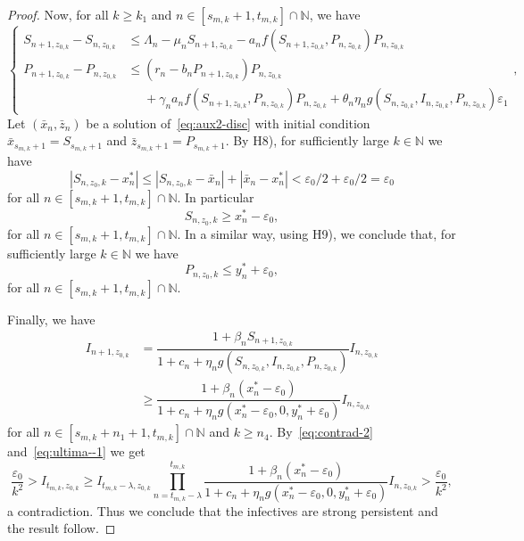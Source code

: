 \documentclass[reqno]{amsart}
\renewcommand{\le}{\leqslant}
\renewcommand{\ge}{\geqslant}
\newcommand{\eps}{\varepsilon}
\newcommand{\N}{\ensuremath{\mathds N}}
\begin{document}
{{\begin{proof}
Now, for all $k \ge k_1$ and $n \in [s_{m,k}+1,t_{m,k}]\cap\N$, we have
\[
\begin{cases}
S_{n+1,z_{0,k}}-S_{n,z_{0,k}}& \le\Lambda_n-\mu_nS_{n+1,z_{0,k}}-a_n{f(S_{n+1,z_{0,k}},P_{n,z_{0,k}})P_{n,z_{0,k}}}\\
P_{n+1,z_{0,k}}-P_{n,z_{0,k}}& \le(r_n-b_nP_{n+1,z_{0,k}})P_{n,z_{0,k}}\\
& \phantom{\le} +\gamma_na_n{f(S_{n+1,z_{0,k}},P_{n,z_{0,k}})P_{n,z_{0,k}}}+\theta_n\eta_ng(S_{n,z_{0,k}},I_{n,z_{0,k}},P_{n,z_{0,k}})\eps_1
\end{cases},
\]
Let $(\bar x_n, \bar z_n)$ be a solution of~\eqref{eq:aux2-disc} with initial condition $\bar x_{s_{m,k}+1}=S_{s_{m,k}+1}$ and $\bar z_{s_{m,k}+1}=P_{s_{m,k}+1}$. By {H8)}, for sufficiently large $k \in \N$ we have
\[
|S_{n,z_0,k}-x^*_n|\le |S_{n,z_0,k}-\bar x_n|+|\bar x_n-x^*_n| < \eps_0/2+\eps_0/2=\eps_0
\]
for all $n \in [s_{m,k}+1,t_{m,k}]\cap\N$. In particular
\begin{equation}\label{eq:final-eq-a}
S_{n,z_0,k} \ge x^*_n - \eps_0,
\end{equation}
for all $n \in [s_{m,k}+1,t_{m,k}]\cap\N$.
In a similar way, using {H9)}, we conclude that, for sufficiently large $k \in \N$ we have
\begin{equation}\label{eq:final-eq-a}
P_{n,z_0,k} \le y^*_n + \eps_0,
\end{equation}
for all $n \in [s_{m,k}+1,t_{m,k}]\cap\N$.

Finally, we have
\begin{equation}\label{eq:ultima--1}
\begin{split}
I_{n+1,z_{0,k}}
& =\dfrac{1+\beta_nS_{n+1,z_{0,k}}}{1+c_n+\eta_n g(S_{n,z_{0,k}},I_{n,z_{0,k}},P_{n,z_{0,k}})}I_{n,z_{0,k}}\\
& \ge \dfrac{1+\beta_n(x^*_n-\eps_0)}{1+c_n+\eta_n g(x^*_n - \eps_0,0,y^*_n+\eps_0)}I_{n,z_{0,k}}
\end{split}
\end{equation}
for all $n \in [s_{m,k}+n_1+1,t_{m,k}]\cap\N$ and $k \ge n_4$. By~\eqref{eq:contrad-2} and~\eqref{eq:ultima--1} we get
\[
\frac{\eps_0}{k^2}
> I_{t_{m,k},z_{0,k}}
\ge I_{t_{m,k}-\lambda,z_{0,k}} \prod_{n=t_{m,k}-\lambda}^{t_{m,k}}
\dfrac{1+\beta_n(x^*_n-\eps_0)}{1+c_n+\eta_n g(x^*_n - \eps_0,0,y^*_n+\eps_0)}I_{n,z_{0,k}} > \frac{\eps_0}{k^2},
\]
a contradiction. Thus we conclude that the infectives are strong persistent and the result follow.
\end{proof}

}}
\end{document}
